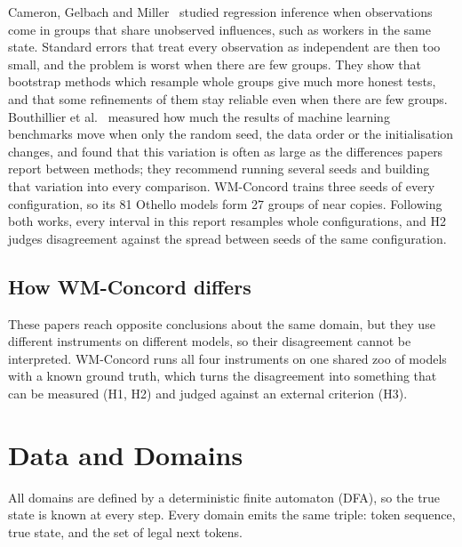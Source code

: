 \documentclass[11pt]{scrartcl}
\begin{document}
Cameron, Gelbach and Miller~\cite{cameron2008bootstrap} studied regression inference when observations come in
groups that share unobserved influences, such as workers in the same state. Standard errors that treat every
observation as independent are then too small, and the problem is worst when there are few groups. They show
that bootstrap methods which resample whole groups give much more honest tests, and that some refinements of
them stay reliable even when there are few groups. Bouthillier et al.~\cite{bouthillier2021variance}
measured how much the results of machine learning benchmarks move when only the random seed, the data order
or the initialisation changes, and found that this variation is often as large as the differences papers
report between methods; they recommend running several seeds and building that variation into every
comparison. WM-Concord trains three seeds of every configuration, so its 81 Othello models form 27 groups of
near copies. Following both works, every interval in this report resamples whole configurations, and H2 judges
disagreement against the spread between seeds of the same configuration.

\subsection{How WM-Concord differs}

These papers reach opposite conclusions about the same domain, but they use different instruments on
different models, so their disagreement cannot be interpreted. WM-Concord runs all four instruments on one
shared zoo of models with a known ground truth, which turns the disagreement into something that can be
measured (H1, H2) and judged against an external criterion (H3).

\section{Data and Domains}
\label{sec:data}

All domains are defined by a deterministic finite automaton (DFA), so the true state is known at every step.
Every domain emits the same triple: token sequence, true state, and the set of legal next tokens.
\end{document}
